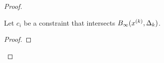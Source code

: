 \begin{proof}
\begin{theorem}
Let $c_i$ be a constraint that intersects $B_{\infty}({x^{(k)}}, \Delta_k)$.
\end{theorem}

\begin{proof}
\end{proof}



\end{proof}
